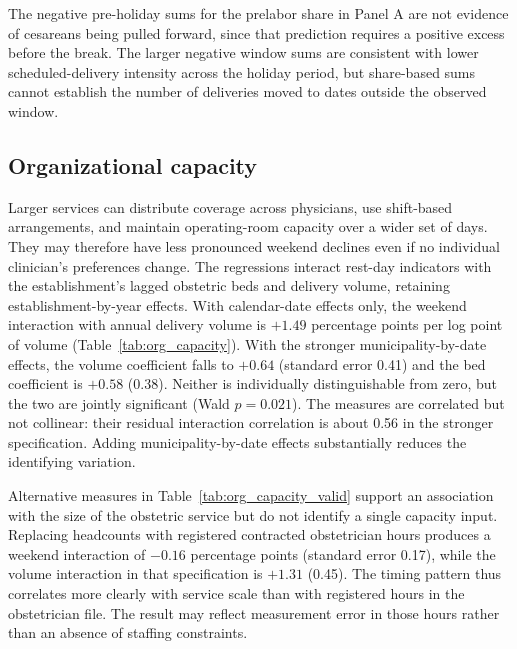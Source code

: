 

The negative pre-holiday sums for the prelabor share in Panel A are not evidence of
cesareans being pulled forward, since that prediction requires a positive excess
before the break. The larger negative window sums are consistent with lower
scheduled-delivery intensity across the holiday period, but share-based sums cannot
establish the number of deliveries moved to dates outside the observed window.

\subsection{Organizational capacity}

Larger services can distribute coverage across physicians, use shift-based
arrangements, and maintain operating-room capacity over a wider set of days. They
may therefore have less pronounced weekend declines even if no individual
clinician's preferences change. The regressions interact rest-day indicators with
the establishment's lagged obstetric beds and delivery volume, retaining
establishment-by-year effects. With calendar-date effects only, the weekend
interaction with annual delivery volume is $+1.49$ percentage points per log point
of volume (Table~\ref{tab:org_capacity}). With the stronger municipality-by-date
effects, the volume coefficient falls to $+0.64$ (standard error 0.41) and the bed
coefficient is $+0.58$ (0.38). Neither is individually distinguishable from zero,
but the two are jointly significant (Wald $p = 0.021$). The measures are
correlated but not collinear: their residual interaction correlation is about 0.56
in the stronger specification. Adding municipality-by-date effects substantially
reduces the identifying variation.



Alternative measures in Table~\ref{tab:org_capacity_valid} support an association
with the size of the obstetric service but do not identify a single capacity input.
Replacing headcounts with registered contracted obstetrician hours produces a
weekend interaction of $-0.16$ percentage points (standard error 0.17), while the
volume interaction in that specification is $+1.31$ (0.45). The timing pattern thus
correlates more clearly with service scale than with registered hours in the
obstetrician file. The result may reflect measurement error in those hours rather
than an absence of staffing constraints.

